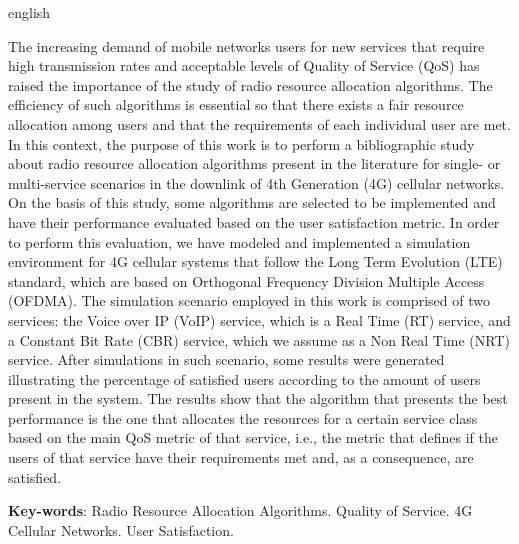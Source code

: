 \begin{resumo}[Abstract]
 \begin{otherlanguage*}{english}
 	
   The increasing demand of mobile networks users for new services that require high transmission rates and acceptable levels of Quality of Service (QoS) has raised the importance of the study of radio resource allocation algorithms. The efficiency of such algorithms is essential so that there exists a fair resource allocation among users and that the requirements of each individual user are met. In this context, the purpose of this work is to perform a bibliographic study about radio resource allocation algorithms present in the literature for single- or multi-service scenarios in the downlink of 4th Generation (4G) cellular networks. On the basis of this study, some algorithms are selected to be implemented and have their performance evaluated based on the user satisfaction metric. In order to perform this evaluation, we have modeled and implemented a simulation environment for 4G cellular systems that follow the Long Term Evolution (LTE) standard, which are based on Orthogonal Frequency Division Multiple Access (OFDMA). The simulation scenario employed in this work is comprised of two services: the Voice over IP (VoIP) service, which is a Real Time (RT) service, and a Constant Bit Rate (CBR) service, which we assume as a Non Real Time (NRT) service. After simulations in such scenario, some results were generated illustrating the percentage of satisfied users according to the amount of users present in the system. The results show that the algorithm that presents the best performance is the one that allocates the resources for a certain service class based on the main QoS metric of that service, i.e., the metric that defines if the users of that service have their requirements met and, as a consequence, are satisfied.
 
   \noindent 
   \textbf{Key-words}: Radio Resource Allocation Algorithms. Quality of Service. 4G Cellular Networks. User Satisfaction.
 \end{otherlanguage*}
\end{resumo}